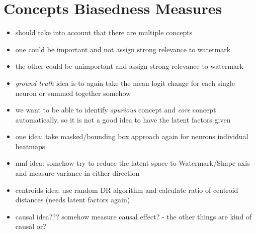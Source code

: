 \section{Concepts Biasedness Measures}
\begin{itemize}
    \item should take into account that there are multiple concepts
    \item one could be important and not assign strong relevance to watermark
    \item the other could be unimportant and assign strong relevance to watermark
    \item \textit{ground truth} idea is to again take the mean logit change for each single neuron or summed together somehow
    \item we want to be able to identify \textit{spurious} concept and \textit{core} concept automatically, so it is not a good idea to have the latent factors given
    \item one idea: take masked/bounding box approach again for neurons individual heatmaps
    \item nmf idea: somehow try to reduce the latent space to Watermark/Shape axis and measure variance in either direction
    \item centroids idea: use random DR algorithm and calculate ratio of centroid distances (needs latent factors again)
    \item causal idea??? somehow measure causal effect? - the other things are kind of causal or?
\end{itemize}



